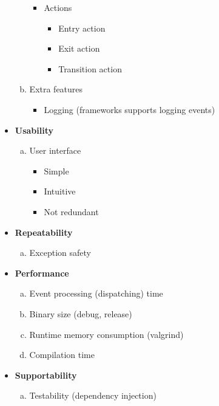\begin{itemize}
\begin{enumerate}[a)]
\begin{itemize}
                \item Actions
                    \begin{itemize}
                        \item Entry action
                        \item Exit action
                        \item Transition action
                    \end{itemize}

            \end{itemize}

        \item Extra features
            \begin{itemize}
                \item Logging (frameworks supports logging events)
            \end{itemize}
    \end{enumerate}

\item \textbf{Usability}
    \begin{enumerate}[a)]
        \item User interface
            \begin{itemize}
                \item Simple
                \item Intuitive
                \item Not redundant
            \end{itemize}
    \end{enumerate}

\item \textbf{Repeatability}
    \begin{enumerate}[a)]
        \item Exception safety
    \end{enumerate}

\item \textbf{Performance}
    \begin{enumerate}[a)]
        \item Event processing (dispatching) time
        \item Binary size (debug, release)
        \item Runtime memory consumption (valgrind)
        \item Compilation time
    \end{enumerate}

\item \textbf{Supportability}
    \begin{enumerate}[a)]
        \item Testability (dependency injection)
    \end{enumerate}


\end{itemize}
